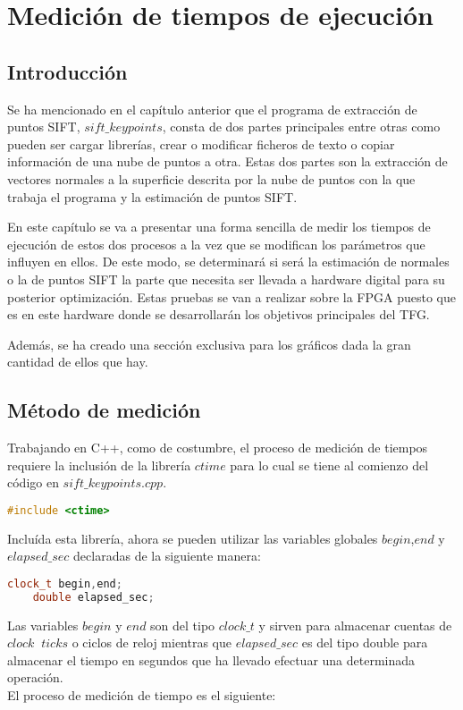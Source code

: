 \chapter{Medición de tiempos de ejecución}

\section{Introducción}
Se ha mencionado en el capítulo anterior que el programa de extracción de puntos SIFT, $sift\_keypoints$, consta de dos partes principales entre otras como pueden ser cargar librerías, crear o modificar ficheros de texto o copiar información de una nube de puntos a otra. Estas dos partes son la extracción de vectores normales a la superficie descrita por la nube de puntos con la que trabaja el programa y la estimación de puntos SIFT.


En este capítulo se va a presentar una forma sencilla de medir los tiempos de ejecución de estos dos procesos a la vez que se modifican los parámetros que influyen en ellos. De este modo, se determinará si será la estimación de normales o la de puntos SIFT la parte que necesita ser llevada a hardware digital para su posterior optimización. Estas pruebas se van a realizar sobre la FPGA puesto que es en este hardware donde se desarrollarán los objetivos principales del TFG.

Además, se ha creado una sección exclusiva para los gráficos dada la gran cantidad de ellos que hay.


\section{Método de medición}
Trabajando en C++, como de costumbre, el proceso de medición de tiempos requiere la inclusión de la librería $ctime$ para lo cual se tiene al comienzo del código en $sift\_keypoints.cpp$.

\begin{lstlisting}[language=C++,breaklines]
	#include <ctime>
\end{lstlisting}

Incluída esta librería, ahora se pueden utilizar las variables globales $begin$,$end$ y $elapsed\_sec$ declaradas de la siguiente manera:

\begin{lstlisting}[language=C++,breaklines]
	clock_t begin,end;
	double elapsed_sec;
\end{lstlisting}

Las variables $begin$ y $end$ son del tipo $clock\_t$ y sirven para almacenar cuentas de $clock\;\; ticks$ o ciclos de reloj mientras que $elapsed\_sec$ es del tipo double para almacenar el tiempo en segundos que ha llevado efectuar una determinada operación.\\
El proceso de medición de tiempo es el siguiente: 

